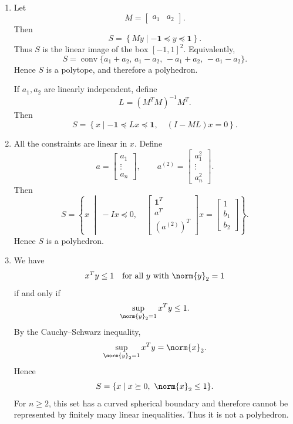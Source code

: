 \documentclass{ctexart}
\begin{document}
\begin{solution}
  \begin{enumerate}
    \item
      Let
      \[
        M =
        \begin{bmatrix} a_1 & a_2
        \end{bmatrix}.
      \]
      Then
      \[
        S
        =
        \left\{
          My \mid -\mathbf{1}\preceq y\preceq\mathbf{1}
        \right\}.
      \]
      Thus \(S\) is the linear image of the box
      \([-1,1]^2\). Equivalently,
      \[
        S
        =
        \operatorname{conv}
        \{a_1+a_2,\,
          a_1-a_2,\,
          -a_1+a_2,\,
        -a_1-a_2\}.
      \]
      Hence \(S\) is a polytope, and therefore a polyhedron.

      If \(a_1,a_2\) are linearly independent, define
      \[
        L=(M^TM)^{-1}M^T.
      \]
      Then
      \[
        S
        =
        \left\{
          x\mid
          -\mathbf{1}\preceq Lx\preceq\mathbf{1},
          \quad
          (I-ML)x=0
        \right\}.
      \]

    \item
      All the constraints are linear in \(x\). Define
      \[
        a=
        \begin{bmatrix}
          a_1\\ \vdots\\ a_n
        \end{bmatrix},
        \qquad
        a^{(2)}=
        \begin{bmatrix}
          a_1^2\\ \vdots\\ a_n^2
        \end{bmatrix}.
      \]
      Then
      \[
        S
        =
        \left\{
          x\;\middle|\;
          -Ix\preceq0,\quad
          \begin{bmatrix}
            \mathbf{1}^T\\
            a^T\\
            (a^{(2)})^T
          \end{bmatrix}x
          =
          \begin{bmatrix}
            1\\b_1\\b_2
          \end{bmatrix}
        \right\}.
      \]
      Hence \(S\) is a polyhedron.

    \item
      We have
      \[
        x^Ty\leq1
        \quad\text{for all }y\text{ with }\norm{y}_2=1
      \]
      if and only if
      \[
        \sup_{\norm{y}_2=1}x^Ty\leq1.
      \]
      By the Cauchy--Schwarz inequality,
      \[
        \sup_{\norm{y}_2=1}x^Ty=\norm{x}_2.
      \]
      Hence
      \[
        S=\{x\mid x\succeq0,\ \norm{x}_2\leq1\}.
      \]
      For \(n\geq2\), this set has a curved spherical boundary and
      therefore cannot be represented by finitely many linear
      inequalities. Thus it is not a polyhedron.


\end{enumerate}
\end{solution}
\end{document}
